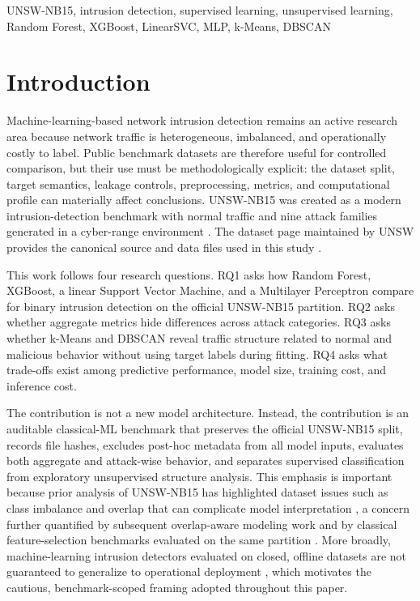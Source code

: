 \documentclass[conference]{IEEEtran}
\begin{document}
\begin{IEEEkeywords}
UNSW-NB15, intrusion detection, supervised learning, unsupervised learning, Random Forest, XGBoost, LinearSVC, MLP, k-Means, DBSCAN
\end{IEEEkeywords}

\section{Introduction}
Machine-learning-based network intrusion detection remains an active research area because network traffic is heterogeneous, imbalanced, and operationally costly to label. Public benchmark datasets are therefore useful for controlled comparison, but their use must be methodologically explicit: the dataset split, target semantics, leakage controls, preprocessing, metrics, and computational profile can materially affect conclusions. UNSW-NB15 was created as a modern intrusion-detection benchmark with normal traffic and nine attack families generated in a cyber-range environment \cite{moustafa2015unsw}. The dataset page maintained by UNSW provides the canonical source and data files used in this study \cite{unswDatasetPage}.

This work follows four research questions. RQ1 asks how Random Forest, XGBoost, a linear Support Vector Machine, and a Multilayer Perceptron compare for binary intrusion detection on the official UNSW-NB15 partition. RQ2 asks whether aggregate metrics hide differences across attack categories. RQ3 asks whether k-Means and DBSCAN reveal traffic structure related to normal and malicious behavior without using target labels during fitting. RQ4 asks what trade-offs exist among predictive performance, model size, training cost, and inference cost.

The contribution is not a new model architecture. Instead, the contribution is an auditable classical-ML benchmark that preserves the official UNSW-NB15 split, records file hashes, excludes post-hoc metadata from all model inputs, evaluates both aggregate and attack-wise behavior, and separates supervised classification from exploratory unsupervised structure analysis. This emphasis is important because prior analysis of UNSW-NB15 has highlighted dataset issues such as class imbalance and overlap that can complicate model interpretation \cite{moustafa2016evaluation}, a concern further quantified by subsequent overlap-aware modeling work \cite{zoghi2024overlap} and by classical feature-selection benchmarks evaluated on the same partition \cite{kasongo2020unsw}. More broadly, machine-learning intrusion detectors evaluated on closed, offline datasets are not guaranteed to generalize to operational deployment \cite{sommerpaxson2010closed}, which motivates the cautious, benchmark-scoped framing adopted throughout this paper.
\end{document}
